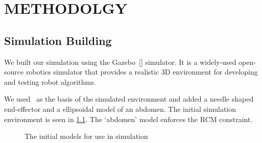 \documentclass[BTech]{iitmdiss}
\begin{document}
    \chapter{METHODOLGY}\label{ch:method}


    \section{Simulation Building}

    We built our simulation using the Gazebo~[\cite{gazebo-url}] simulator.
    It is a widely-used open-source robotics simulator that provides a realistic 3D environment for developing and testing robot algorithms.

    We used~\cite{hennersperger2017towards} as the basis of the simulated environment and added a needle shaped end-effector and a ellipsoidal model of an abdomen.
    The initial simulation environment is seen in \ref{fig:initial_simulation_models}.
    The `abdomen' model enforces the RCM constraint.

    \begin{figure}%
        \centering
        \qquad
        \qquad
        \caption{The initial models for use in simulation}
        \label{fig:initial_simulation_models}
    \end{figure}
\end{document}
